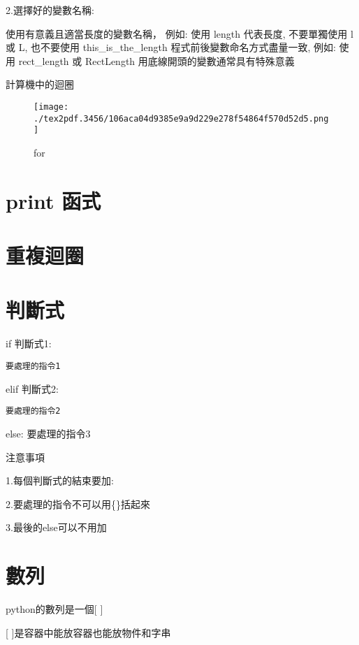 \documentclass[12pt,,]{report}
\begin{document}
2.選擇好的變數名稱:

使用有意義且適當長度的變數名稱， 例如: 使用 length 代表長度,
不要單獨使用 l 或 L, 也不要使用 this\_is\_the\_length
程式前後變數命名方式盡量一致, 例如: 使用 rect\_length 或 RectLength
用底線開頭的變數通常具有特殊意義

計算機中的迴圈

\begin{figure}
\centering
\texttt{[image: ./tex2pdf.3456/106aca04d9385e9a9d229e278f54864f570d52d5.png]}
\caption{for\label{fig:迴圈}}
\end{figure}

\hypertarget{print-ux51fdux5f0f}{%
\section{print 函式}\label{print-ux51fdux5f0f}}

\hypertarget{ux91cdux8907ux8ff4ux5708}{%
\section{重複迴圈}\label{ux91cdux8907ux8ff4ux5708}}

\hypertarget{ux5224ux65b7ux5f0f}{%
\section{判斷式}\label{ux5224ux65b7ux5f0f}}

if 判斷式1:

\begin{verbatim}
要處理的指令1
\end{verbatim}

elif 判斷式2:

\begin{verbatim}
要處理的指令2
\end{verbatim}

else: 要處理的指令3

注意事項

1.每個判斷式的結束要加:

2.要處理的指令不可以用\{\}括起來

3.最後的else可以不用加

\hypertarget{ux6578ux5217}{%
\section{數列}\label{ux6578ux5217}}

python的數列是一個{[} {]}

{[} {]}是容器中能放容器也能放物件和字串
\end{document}
